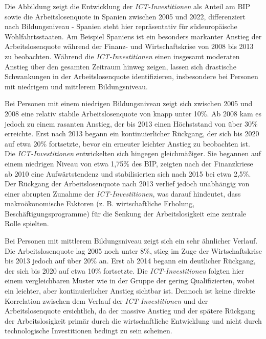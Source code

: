 Die Abbildung zeigt die Entwicklung der \textit{\ac{ICT}-Investitionen} als Anteil am 
BIP sowie die Arbeitslosenquote in Spanien zwischen 2005 und 2022, differenziert nach 
Bildungsniveau - Spanien steht hier repräsentativ für südeuropäische Wohlfahrtsstaaten. 
Am Beispiel Spaniens ist ein besonders markanter Anstieg der Arbeitslosenquote während 
der Finanz- und Wirtschaftskrise von 2008 bis 2013 zu beobachten. Während die 
\textit{\ac{ICT}-Investitionen} einen insgesamt moderaten Anstieg über den gesamten 
Zeitraum hinweg zeigen, lassen sich drastische Schwankungen in der Arbeitslosenquote 
identifizieren, insbesondere bei Personen mit niedrigem und mittlerem Bildungsniveau.

Bei Personen mit einem niedrigen Bildungsniveau zeigt sich zwischen 2005 und 2008 
eine relativ stabile Arbeitslosenquote von knapp unter 10\%. Ab 2008 kam es jedoch zu 
einem rasanten Anstieg, der bis 2013 einen Höchststand von über 30\% erreichte. Erst 
nach 2013 begann ein kontinuierlicher Rückgang, der sich bis 2020 auf etwa 20\% 
fortsetzte, bevor ein erneuter leichter Anstieg zu beobachten ist. Die 
\textit{\ac{ICT}-Investitionen} entwickelten sich hingegen gleichmäßiger. Sie begannen 
auf einem niedrigen Niveau von etwa 1,75\% des BIP, zeigten nach der Finanzkriese ab 
2010 eine Aufwärtstendenz und stabilisierten sich nach 2015 bei etwa 2,5\%. Der 
Rückgang der Arbeitslosenquote nach 2013 verlief jedoch unabhängig von einer abrupten 
Zunahme der \textit{\ac{ICT}-Investitionen}, was darauf hindeutet, dass 
makroökonomische Faktoren (z. B. wirtschaftliche Erholung, Beschäftigungsprogramme) 
für die Senkung der Arbeitslosigkeit eine zentrale Rolle spielten.

Bei Personen mit mittlerem Bildungsniveau zeigt sich ein sehr ähnlicher Verlauf. Die 
Arbeitslosenquote lag 2005 noch unter 8\%, stieg im Zuge der Wirtschaftskrise bis 2013 
jedoch auf über 20\% an. Erst ab 2014 begann ein deutlicher Rückgang, der sich bis 
2020 auf etwa 10\% fortsetzte. Die \textit{\ac{ICT}-Investitionen} folgten hier einem 
vergleichbaren Muster wie in der Gruppe der gering Qualifizierten, wobei ein leichter, 
aber kontinuierlicher Anstieg sichtbar ist. Dennoch ist keine direkte Korrelation 
zwischen dem Verlauf der \textit{\ac{ICT}-Investitionen} und der Arbeitslosenquote 
ersichtlich, da der massive Anstieg und der spätere Rückgang der Arbeitslosigkeit 
primär durch die wirtschaftliche Entwicklung und nicht durch technologische 
Investitionen bedingt zu sein scheinen.

